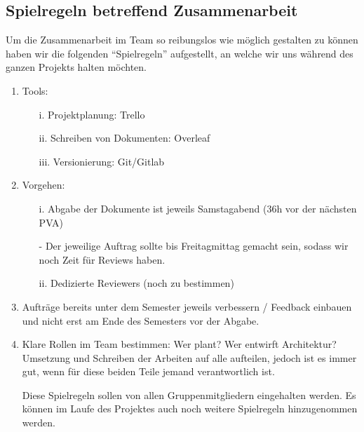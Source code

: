\subsection{Spielregeln betreffend Zusammenarbeit}
Um die Zusammenarbeit im Team so reibungslos wie möglich gestalten zu können haben wir die folgenden ``Spielregeln'' aufgestellt, an welche wir uns während des ganzen Projekts halten möchten.
\begin{enumerate}
\item Tools:
    \begin{itemize}
        \item [i.]Projektplanung: Trello
        \item [ii.]Schreiben von Dokumenten: Overleaf
        \item [iii.]Versionierung: Git/Gitlab
    \end{itemize}
\item Vorgehen:
    \begin{itemize}
        \item [i.]Abgabe der Dokumente ist jeweils Samstagabend 
        \newline(36h vor der nächsten PVA)
        \item[-]Der jeweilige Auftrag sollte bis Freitagmittag gemacht sein, sodass wir
        noch Zeit für Reviews haben.
        \item [ii.]Dedizierte Reviewers (noch zu bestimmen)
    \end{itemize}
\item Aufträge bereits unter dem Semester jeweils verbessern / Feedback einbauen und nicht erst am Ende des Semesters vor der Abgabe.
\item Klare Rollen im Team bestimmen: Wer plant? Wer entwirft Architektur? 
Umsetzung und Schreiben der Arbeiten auf alle aufteilen, jedoch ist es immer gut, wenn für diese beiden Teile jemand verantwortlich ist.


Diese Spielregeln sollen von allen Gruppenmitgliedern eingehalten werden. Es können im Laufe des Projektes auch noch weitere Spielregeln hinzugenommen werden.
\end{enumerate}